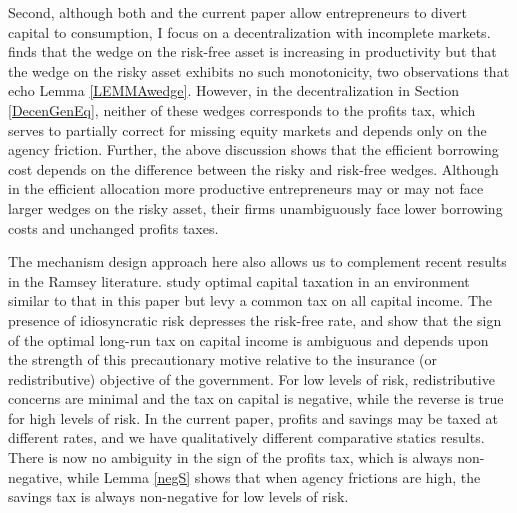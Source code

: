 \documentclass[11pt]{article}
\theoremstyle{plain}
\theoremstyle{definition} %
\begin{document}
Second, although both \cite{shourideh_optimal_2013} and the current paper allow entrepreneurs to divert capital to consumption, I focus on a decentralization with incomplete markets. \cite{shourideh_optimal_2013} finds that the wedge on the risk-free asset is increasing in productivity but that the wedge on the risky asset exhibits no such monotonicity, two observations that echo Lemma \ref{LEMMAwedge}. However, in the decentralization in Section \ref{DecenGenEq}, neither of these wedges corresponds to the profits tax, which serves to partially correct for missing equity markets and depends only on the agency friction. Further, the above discussion shows that the efficient borrowing cost depends on the difference between the risky and risk-free wedges. Although in the efficient allocation more productive entrepreneurs may or may not face larger wedges on the risky asset, their firms unambiguously face lower borrowing costs and unchanged profits taxes. 


The mechanism design approach here also allows us to complement recent results in the Ramsey literature. \cite{panousi_optimal_2012} study optimal capital taxation in an environment similar to that in this paper but levy a common tax on all capital income. The presence of idiosyncratic risk depresses the risk-free rate, and \cite{panousi_optimal_2012} show that the sign of the optimal long-run tax on capital income is ambiguous and depends upon the strength of this precautionary motive relative to the insurance (or redistributive) objective of the government. For low levels of risk, redistributive concerns are minimal and the tax on capital is negative, while the reverse is true for high levels of risk. In the current paper, profits and savings may be taxed at different rates, and we have qualitatively different comparative statics results. There is now no ambiguity in the sign of the profits tax, which is always non-negative, while Lemma \ref{negS} shows that when agency frictions are high, the savings tax is always non-negative for low levels of risk.
\end{document}
